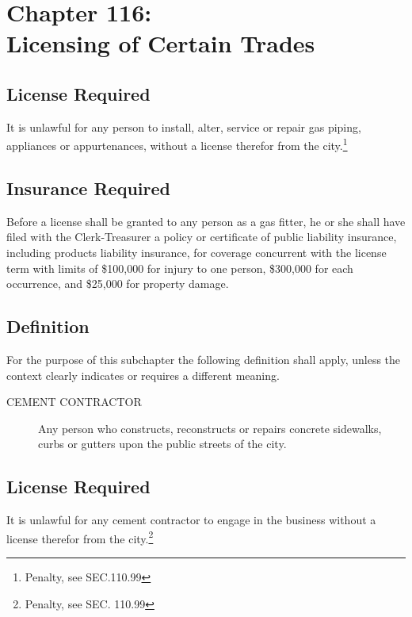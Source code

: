\chapter*{Chapter 116: \\
	Licensing of Certain Trades}
    \vfill
    \minitoc
    \pagebreak


\setcounter{section}{14}
\section{License Required}
It is unlawful for any person to install, alter, service or repair gas piping, appliances or appurtenances, without a license therefor from the city.\footnote{Penalty, see SEC.110.99}

\section{Insurance Required}
Before a license shall be granted to any person as a gas fitter, he or she shall have filed with the Clerk-Treasurer a policy or certificate of public liability insurance, including products liability insurance, for coverage concurrent with the license term with limits of \$100,000 for injury to one person, \$300,000 for each occurrence, and \$25,000 for property damage.


\setcounter{section}{29}
\section{Definition}
For the purpose of this subchapter the following definition shall apply, unless the context clearly indicates or requires a different meaning.
\begin{description}
    \item[CEMENT CONTRACTOR] Any person who constructs, reconstructs or repairs concrete sidewalks, curbs or gutters upon the public streets of the city.
\end{description}

\section{License Required}
It is unlawful for any cement contractor to engage in the business without a license therefor from the city.\footnote{Penalty, see SEC. 110.99}

